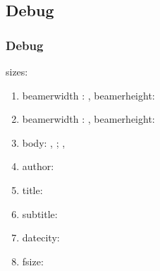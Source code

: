 \documentclass[german,notoc]{tudbeamer}%
\begin{document}
\subsection{Debug}
\makeatletter
\begin{frame}[allowframebreaks]
	\frametitle{Debug}
	sizes:
	\begin{enumerate}
		\item beamerwidth : \the\paperwidth, beamerheight: \the\paperheight
		\item beamerwidth : \number\paperwidth, beamerheight:\number\paperheight
		\item body: \the\bodyx, \the\bodyy; \the\bodywidth, \the\bodywidth
		\item author: \insertauthor
		\item title: \inserttitle
		\item subtitle: \insertsubtitle
		\item datecity: \insertdatecity
		\item fsize: \f@size
	\end{enumerate}
\end{frame}
\makeatother

%
%

\disableSectionFrame%
\end{document}
